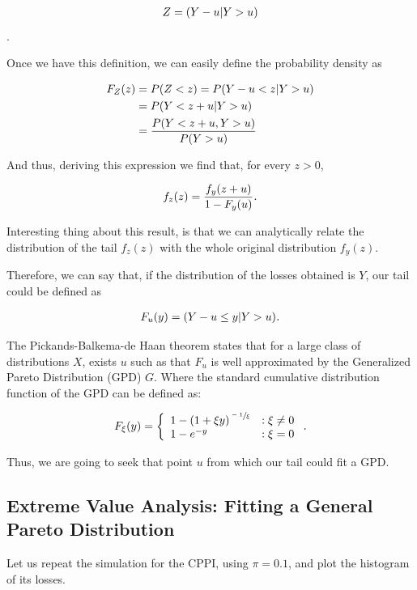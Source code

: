 \begin{align}
    Z = \qty(Y-u | Y>u)
\end{align}.

Once we have this definition, we can easily define the probability density as

\begin{align}
    F_Z(z)  &=  P(Z < z) = P\qty(Y-u < z | Y>u)  \\
            &=  P\qty(Y<z+u | Y>u) \\
            &= \frac{P\qty(Y<z+u, Y>u)}{P\qty(Y>u)}
\end{align}

And thus, deriving this expression we find that, for every $z>0$,

\begin{align}
    f_z(z) = \frac{f_y\qty(z+u)}{1-F_y(u)}\textit{.}
\end{align}

Interesting thing about this result, is that we can analytically relate the distribution of the tail $f_z(z)$ with the whole original distribution $f_y(z)$.

Therefore, we can say that, if the distribution of the losses obtained is $Y$, our tail could be defined as

\begin{align}
    F_u(y) = \qty( Y - u \leq y| Y > u ) \emph{.}
\end{align}

The Pickands-Balkema-de Haan theorem states that for a large class of distributions $X$, exists $u$ such as that $F_u$ is well approximated by the Generalized Pareto Distribution (GPD) $G$. Where the standard cumulative distribution function of the GPD can be defined as:


\[F_{\xi}(y) = \left\{
  \begin{array}{lr}
    1 - \qty(1 + \xi y)^{\sfrac{-1}{\xi}} & : \xi \neq 0\\
    1 - e^{-y} & : \xi = 0
  \end{array}
\right. \emph{.}
\]

Thus, we are going to seek that point $u$ from which our tail could fit a GPD.


\subsection{Extreme Value Analysis: Fitting a General Pareto Distribution}

Let us repeat the simulation for the CPPI, using $\pi = 0.1$, and plot the histogram of its losses.

